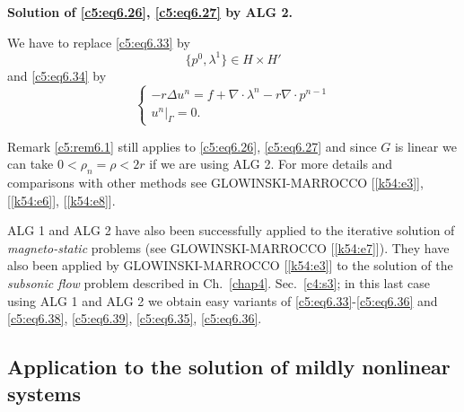 \noindent \textbf{Solution of \eqref{c5:eq6.26}, \eqref{c5:eq6.27} by ALG 2.} 

We have to replace \eqref{c5:eq6.33} by 
\begin{equation}
\{ p^0 , \lambda^1 \} \in H \times H' \tag{6.38}\label{c5:eq6.38}
\end{equation}
and \eqref{c5:eq6.34} by 
\begin{equation}
\begin{cases}
-r \Delta u^n = f + \nabla \cdot \lambda^n - r \nabla 
\cdot p^{n-1}\\ 
u^n |_\Gamma =0. \tag{6.39}\label{c5:eq6.39}
\end{cases}
\end{equation}

Remark \ref{c5:rem6.1} 
 still applies to \eqref{c5:eq6.26}, \eqref{c5:eq6.27} and since $G$ is 
 linear we can take $0 < \rho_n = \rho < 2r$ if we are using ALG 2.  
 For more details and comparisons with other methods see 
 GLOWINSKI-MARROCCO [\ref{k54:e3}], [\ref{k54:e6}], [\ref{k54:e8}].    


\begin{remark}\label{c5:rem6.2}%
ALG 1 and ALG 2 have also been successfully applied to the iterative 
solution of \textit{magneto-static} problems (see GLOWINSKI-MARROCCO 
[\ref{k54:e7}]). They have also been applied  by  GLOWINSKI-\break MARROCCO
[\ref{k54:e3}]  to the 
solution of the \textit{subsonic flow} problem described in 
Ch.~\ref{chap4}.  Sec.~\ref{c4:s3}; in this last case using ALG 1 and 
ALG 2 we obtain easy variants of  
\eqref{c5:eq6.33}-\eqref{c5:eq6.36} and \eqref{c5:eq6.38}, 
\eqref{c5:eq6.39},  \eqref{c5:eq6.35}, \eqref{c5:eq6.36}.         
 \end{remark}
 
\subsection{Application to the solution of mildly nonlinear 
systems}\label{c5:ss6.4}

